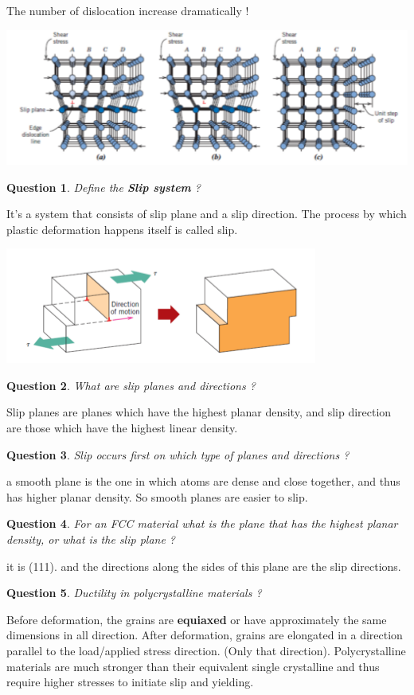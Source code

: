 \documentclass[13]{article}
\newtheorem{exer}{Question}
\begin{document}
The number of dislocation increase dramatically !
\begin{center}
\includegraphics[scale=0.5]{figures/14.png}
\end{center}
\begin{exer}
Define the \textbf{Slip system}  ?
\end{exer}
It's a system that consists of slip plane and a slip direction. The process by which plastic deformation happens itself is called slip.
\begin{center}
\includegraphics[scale=0.5]{figures/15.png}
\end{center}
\begin{exer}
	What are slip planes and directions ?
\end{exer}
Slip planes are planes which have the highest planar density, and slip direction are those which have the highest linear density. 
\begin{exer}
	Slip occurs first on which type of planes and directions ?
\end{exer}
a smooth plane is the one in which atoms are dense and close together, and thus has higher planar density. So smooth planes are easier to slip.
\begin{exer}
For an FCC material what is the plane that has the highest planar density, or what is the slip plane ?
\end{exer}
it is (111). and the directions along the sides of this plane are the slip directions. 
\begin{exer}
Ductility in polycrystalline materials ?
\end{exer}
Before deformation, the grains are \textbf{equiaxed} or have approximately the same dimensions in all direction. After deformation, grains are elongated in a direction parallel to the load/applied stress direction. (Only that direction). Polycrystalline materials are much stronger than their equivalent single crystalline and thus require higher stresses to initiate slip and yielding. 
\end{document}
